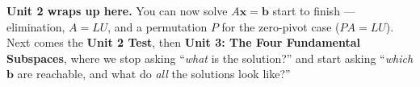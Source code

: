 \documentclass[10pt]{article}
\newcommand{\xx}{\mathbf{x}}
\newcommand{\bb}{\mathbf{b}}
\newcommand{\PP}{P}
\begin{document}
\begin{spiralbox}
\textbf{Unit 2 wraps up here.} You can now solve $A\xx=\bb$ start to finish --- elimination, $A=LU$, and
a permutation $\PP$ for the zero-pivot case ($\PP A=LU$). Next comes the \textbf{Unit 2 Test}, then
\textbf{Unit 3: The Four Fundamental Subspaces}, where we stop asking ``\emph{what} is the solution?'' and
start asking ``\emph{which} $\bb$ are reachable, and what do \emph{all} the solutions look like?''
\end{spiralbox}
\end{document}
